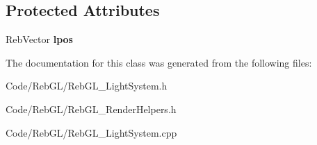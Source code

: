\subsection*{Protected Attributes}
\begin{DoxyCompactItemize}
\item 
Reb\+Vector {\bfseries lpos}\hypertarget{class_shadow_map_a5e44648fc5c0950d55b834d5f41caeb8}{}\label{class_shadow_map_a5e44648fc5c0950d55b834d5f41caeb8}

\end{DoxyCompactItemize}


The documentation for this class was generated from the following files\+:\begin{DoxyCompactItemize}
\item 
Code/\+Reb\+G\+L/Reb\+G\+L\+\_\+\+Light\+System.\+h\item 
Code/\+Reb\+G\+L/Reb\+G\+L\+\_\+\+Render\+Helpers.\+h\item 
Code/\+Reb\+G\+L/Reb\+G\+L\+\_\+\+Light\+System.\+cpp\end{DoxyCompactItemize}
